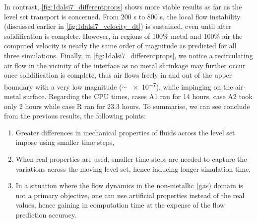 In contrast, \cref{fig:1dalsi7_differentprops} shows more viable results as far as the level set transport is concerned.
From 200 s to 800 s, the local flow instability (discussed earlier in \cref{fig:1dalsi7_velocity_dt}) is sustained, even until after solidification is complete.
However, in regions of 100\% metal and 100\% air the computed velocity is nearly the same order of magnitude as predicted for all three simulations.
Finally, in \cref{fig:1dalsi7_differentprops}, we notice a recirculating air flow in the vicinity of the interface as no metal shrinkage 
may further occur once solidification is complete, thus air flows freely in and out 
of the upper boundary with a very low magnitude ($\sim$ \SI{e-7}{\uvelocity}), while impinging on the air-metal surface.
Regarding the CPU times, cases A1 ran for 14 hours, case A2 took only 2 hours while case R ran for 23.3 hours.
To summarise, we can see conclude from the previous results, the following points:
\begin{enumerate}
	\itemsep0em 
	\item Greater differences in mechanical properties of fluids across the level set impose using smaller time steps,
	\item When real properties are used, smaller time steps are needed to capture the variations across the moving level set, hence inducing longer simulation time,
	\item In a situation where the flow dynamics in the non-metallic (gas) domain is not a primary objective, one can 
		   use artificial properties instead of the real values, hence gaining in computation time at the expense of the flow prediction accuracy.
\end{enumerate}  
